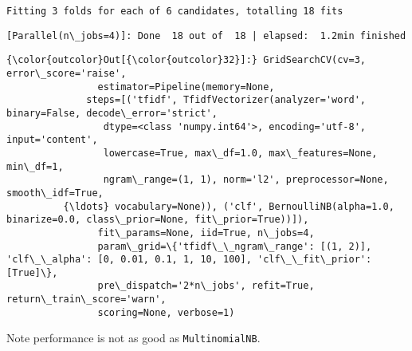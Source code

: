 \documentclass[11pt]{article}
\begin{document}
    \begin{Verbatim}[commandchars=\\\{\}]
Fitting 3 folds for each of 6 candidates, totalling 18 fits

    \end{Verbatim}

    \begin{Verbatim}[commandchars=\\\{\}]
[Parallel(n\_jobs=4)]: Done  18 out of  18 | elapsed:  1.2min finished

    \end{Verbatim}

\begin{Verbatim}[commandchars=\\\{\}]
{\color{outcolor}Out[{\color{outcolor}32}]:} GridSearchCV(cv=3, error\_score='raise',
                estimator=Pipeline(memory=None,
              steps=[('tfidf', TfidfVectorizer(analyzer='word', binary=False, decode\_error='strict',
                 dtype=<class 'numpy.int64'>, encoding='utf-8', input='content',
                 lowercase=True, max\_df=1.0, max\_features=None, min\_df=1,
                 ngram\_range=(1, 1), norm='l2', preprocessor=None, smooth\_idf=True,
          {\ldots} vocabulary=None)), ('clf', BernoulliNB(alpha=1.0, binarize=0.0, class\_prior=None, fit\_prior=True))]),
                fit\_params=None, iid=True, n\_jobs=4,
                param\_grid=\{'tfidf\_\_ngram\_range': [(1, 2)], 'clf\_\_alpha': [0, 0.01, 0.1, 1, 10, 100], 'clf\_\_fit\_prior': [True]\},
                pre\_dispatch='2*n\_jobs', refit=True, return\_train\_score='warn',
                scoring=None, verbose=1)
\end{Verbatim}
            
    Note performance is not as good as \texttt{MultinomialNB}.
\end{document}
